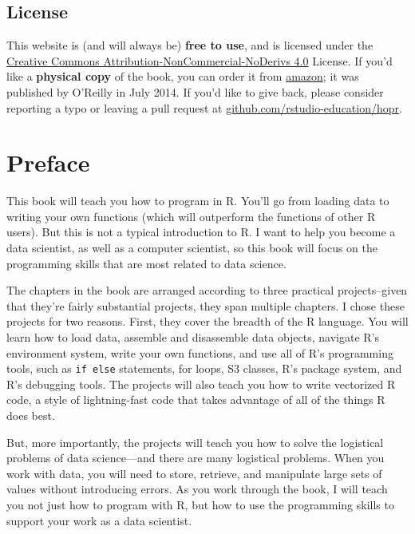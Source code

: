 \documentclass[
  letterpaper,
  DIV=11,
  numbers=noendperiod]{scrbook}
\begin{document}
\section*{License}\label{license}


This website is (and will always be) \textbf{free to use}, and is
licensed under the
\href{https://creativecommons.org/licenses/by-nc-nd/4.0/}{Creative
Commons Attribution-NonCommercial-NoDerivs 4.0} License. If you'd like a
\textbf{physical copy} of the book, you can order it from
\href{https://www.amazon.com/Hands-Programming-Write-Functions-Simulations/dp/1449359019}{amazon};
it was published by O'Reilly in July 2014. If you'd like to give back,
please consider reporting a typo or leaving a pull request at
\href{https://github.com/rstudio-education/hopr}{github.com/rstudio-education/hopr}.


\chapter*{Preface}\label{preface}


This book will teach you how to program in R. You'll go from loading
data to writing your own functions (which will outperform the functions
of other R users). But this is not a typical introduction to R. I want
to help you become a data scientist, as well as a computer scientist, so
this book will focus on the programming skills that are most related to
data science.

The chapters in the book are arranged according to three practical
projects--given that they're fairly substantial projects, they span
multiple chapters. I chose these projects for two reasons. First, they
cover the breadth of the R language. You will learn how to load data,
assemble and disassemble data objects, navigate R's environment system,
write your own functions, and use all of R's programming tools, such as
\texttt{if\ else} statements, for loops, S3 classes, R's package system,
and R's debugging tools. The projects will also teach you how to write
vectorized R code, a style of lightning-fast code that takes advantage
of all of the things R does best.

But, more importantly, the projects will teach you how to solve the
logistical problems of data science---and there are many logistical
problems. When you work with data, you will need to store, retrieve, and
manipulate large sets of values without introducing errors. As you work
through the book, I will teach you not just how to program with R, but
how to use the programming skills to support your work as a data
scientist.
\end{document}
